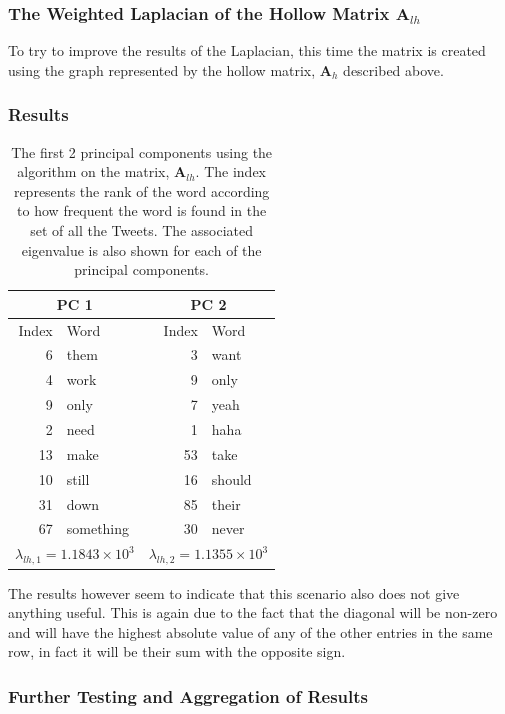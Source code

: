 \documentclass[11pt,a4paper]{article}
\newcommand{\covmat}{\mathbf{A}}
\begin{document}
\subsubsection{The Weighted Laplacian of the Hollow Matrix $\mathbf{A}_{lh}$}

To try to improve the results of the Laplacian, this time the matrix is created using the graph represented by the hollow matrix, $\covmat_h$ described above.

\subsubsection*{Results}
\begin{table}[H]
\center
\begin{tabular}{| r| l | r| l |}
\hline
\multicolumn{2}{|c|}{PC 1} & \multicolumn{2}{|c|}{PC 2}\\
\hline
Index & Word & Index & Word\\
\hline
6 & them & 3 & want\\
4 & work & 9 & only\\
9 & only & 7 & yeah\\
2 & need & 1 & haha\\
13 & make & 53 & take\\
10 & still & 16 & should\\
31 & down & 85 & their\\
67 & something & 30 & never\\
\hline
\multicolumn{2}{|c|}{ $\lambda_{lh,1} =1.1843\times 10^3$}  &
\multicolumn{2}{|c|}{ $\lambda_{lh, 2} = 1.1355 \times 10^3$}  \\
\hline
\end{tabular}
\caption{The first 2 principal components using the algorithm on the matrix, $ \mathbf{A}_{lh}$. The index represents the rank of the word according to how frequent the word is found in the set of all the Tweets. The associated eigenvalue is also shown for each of the principal components.}
\end{table}

The results however seem to indicate that this scenario also does not give anything useful. This is again due to the fact that the diagonal will be non-zero and will have the highest absolute value of any of the other entries in the same row, in fact it will be their sum with the opposite sign.  

\subsubsection*{Further Testing and Aggregation of Results}
\end{document}
